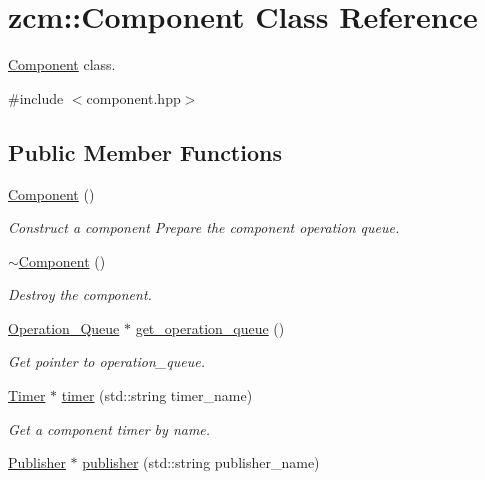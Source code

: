 \hypertarget{classzcm_1_1Component}{\section{zcm\-:\-:Component Class Reference}
\label{classzcm_1_1Component}
}


\hyperlink{classzcm_1_1Component}{Component} class.  




{\ttfamily \#include $<$component.\-hpp$>$}

\subsection*{Public Member Functions}
\begin{DoxyCompactItemize}
\item 
\hyperlink{classzcm_1_1Component_a6fd6b1f309a6b464a14c22a94d18f040}{Component} ()
\begin{DoxyCompactList}\small\item\em Construct a component Prepare the component operation queue. \end{DoxyCompactList}\item 
\hyperlink{classzcm_1_1Component_a0bab6bb89e49affa281179f5d6aeff6a}{$\sim$\-Component} ()
\begin{DoxyCompactList}\small\item\em Destroy the component. \end{DoxyCompactList}\item 
\hyperlink{classzcm_1_1Operation__Queue}{Operation\-\_\-\-Queue} $\ast$ \hyperlink{classzcm_1_1Component_a1180421a4287752b04db9dc00399605d}{get\-\_\-operation\-\_\-queue} ()
\begin{DoxyCompactList}\small\item\em Get pointer to operation\-\_\-queue. \end{DoxyCompactList}\item 
\hyperlink{classzcm_1_1Timer}{Timer} $\ast$ \hyperlink{classzcm_1_1Component_ade89bc05fd836ccb7951047cc35c277d}{timer} (std\-::string timer\-\_\-name)
\begin{DoxyCompactList}\small\item\em Get a component timer by name. \end{DoxyCompactList}\item 
\hyperlink{classzcm_1_1Publisher}{Publisher} $\ast$ \hyperlink{classzcm_1_1Component_a706edac99bd6b40210fba3e8253acef3}{publisher} (std\-::string publisher\-\_\-name)

\end{DoxyCompactItemize}
